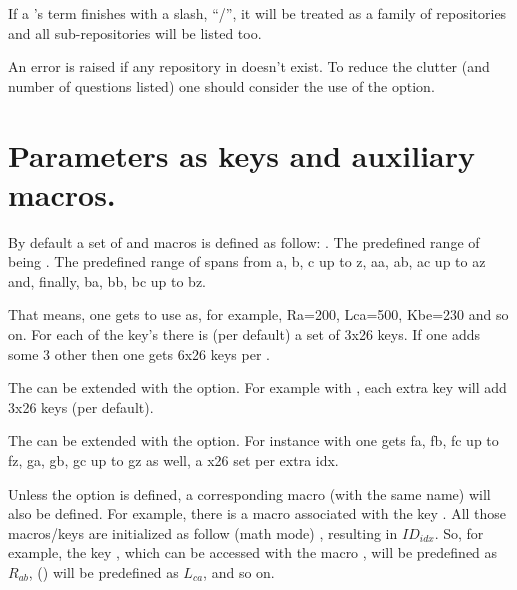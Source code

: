 \documentclass[10pt]{article}
\begin{document}
\begin{tsremark}
If a 's term finishes with a slash, ``/'', it will be treated as a family of repositories and all sub-repositories will be listed too.
\end{tsremark}

\begin{tsremark}
An error is raised if any repository in  doesn't exist. To reduce the clutter (and number of questions listed) one should consider the use of the   option.
\end{tsremark}

\section{Parameters as keys and auxiliary macros.}\label{parameters}

By default a set of  and macros is defined as follow: . The predefined range of  being . The predefined range of  spans from a, b, c up to z, aa, ab, ac up to az and, finally, ba, bb, bc up to bz. 
\begin{tsremark}
That means, one gets to use  as, for example, Ra=200, Lca=500, Kbe=230 and so on. For each of the key's  there is (per default) a set of 3x26 keys. If one adds some 3 other  then one gets 6x26 keys per .
\end{tsremark}
\begin{tsremark}
The  can be extended with the  option. For example with , each extra key will add 3x26 keys (per default).
\end{tsremark}
\begin{tsremark}
The  can be extended with the  option. For instance with  one gets fa, fb, fc up to fz, ga, gb, gc up to gz as well, a x26 set per extra idx.
\end{tsremark}

Unless the  option is defined, a corresponding macro (with the same name) will also be defined. For example, there is a macro \tsobj{\Ra} associated with the key .
All those macros/keys are initialized  as follow (math mode) , resulting in $ID_{idx}$. So, for example, the key , which can be accessed with the macro \tsobj{\Rab},  will be predefined as $R_{ab}$,  (\tsobj{\Lca}) will be predefined as $L_{ca}$, and so on.
\end{document}
